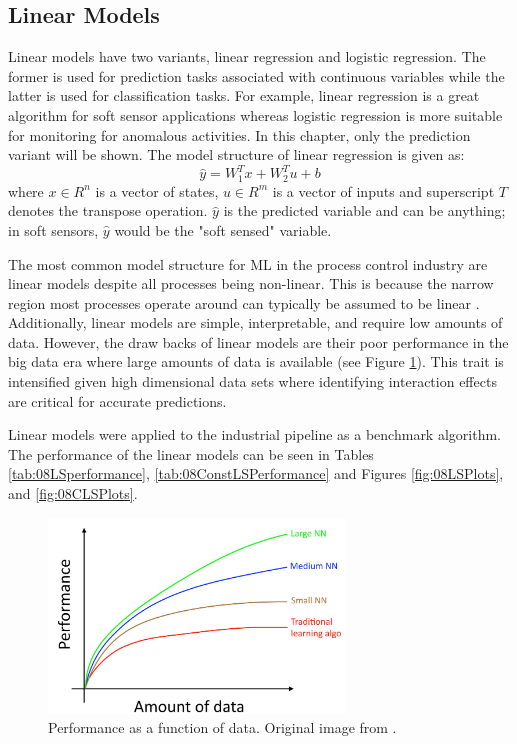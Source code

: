 \subsection{Linear Models}
Linear models have two variants, linear regression and logistic regression.  The former is used for prediction tasks associated with continuous variables while the latter is used for classification tasks.  For example, linear regression is a great algorithm for soft sensor applications whereas logistic regression is more suitable for monitoring for anomalous activities. In this chapter, only the prediction variant will be shown. The model structure of linear regression is given as:
\begin{equation}
    \hat{y} = W_1^Tx + W_2^Tu + b
    \label{eq:02LS}
\end{equation}
where $x \in R^n$ is a vector of states, $u \in R^{m}$ is a vector of inputs and superscript $T$ denotes the transpose operation.  $\hat{y}$ is the predicted variable and can be anything; in soft sensors, $\hat{y}$ would be the "soft sensed" variable.  

The most common model structure for ML in the process control industry are linear models despite all processes being non-linear.  This is because the narrow region most processes operate around can typically be assumed to be linear \cite{process_control_ref13}.  Additionally, linear models are simple, interpretable, and require low amounts of data. However, the draw backs of linear models are their poor performance in the big data era where large amounts of data is available (see Figure \ref{fig:02learning_aggro}).  This trait is intensified given high dimensional data sets where identifying interaction effects are critical for accurate predictions.

Linear models were applied to the industrial pipeline as a benchmark algorithm.  The performance of the linear models can be seen in Tables \ref{tab:08LSperformance}, \ref{tab:08ConstLSPerformance} and Figures \ref{fig:08LSPlots}, and \ref{fig:08CLSPlots}. 

\begin{figure}
    \centering
    \includegraphics[width=0.7\textwidth]{images/ch2/02Learning_Aggro.png}
    \caption{Performance as a function of data.  Original image from \cite{deeplearning_course}.}
    \label{fig:02learning_aggro}
\end{figure}

